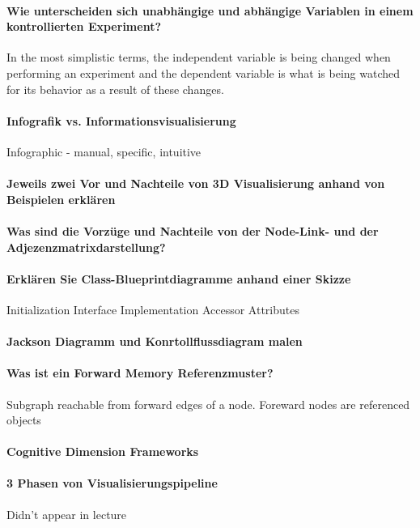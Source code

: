 \documentclass[10pt,a4paper]{article}
\begin{document}
	\paragraph{Wie unterscheiden sich unabhängige und abhängige Variablen in einem kontrollierten Experiment?}
	In the most simplistic terms, the independent variable is being changed when performing an experiment and the dependent variable is what is being watched for its behavior as a result of these changes.
	
	\paragraph{Infografik vs. Informationsvisualisierung}
	Infographic - manual, specific, intuitive
	
	\paragraph{Jeweils zwei Vor und Nachteile von 3D Visualisierung anhand von Beispielen erklären}
	
	\paragraph{Was sind die Vorzüge und Nachteile von der Node-Link- und der Adjezenzmatrixdarstellung?}
	
	\paragraph{Erklären Sie Class-Blueprintdiagramme anhand einer Skizze}
	Initialization
	Interface
	Implementation
	Accessor
	Attributes
	
	
	\paragraph{Jackson Diagramm und Konrtollflussdiagram malen}
	
	\paragraph{Was ist ein Forward Memory Referenzmuster? } Subgraph reachable from forward edges of a node. Foreward nodes are referenced objects
	
	\paragraph{Cognitive Dimension Frameworks}
	
	\paragraph{3 Phasen von Visualisierungspipeline} Didn't appear in lecture
	
	
\end{document}
